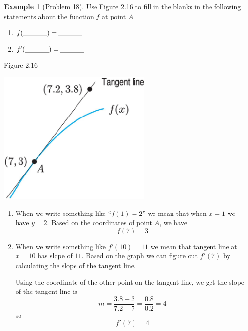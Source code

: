 \documentclass[oneside]{book}
\newcommand{\blank}{\underline{\hspace{0.5in}}}
\theoremstyle{definition}
\newtheorem{example}{Example}
\newcommand{\handoutpagebreak}{}
\theoremstyle{solution}
\newtheorem*{solution}{Solution}
\newcommand{\handoutpagebreak}{\newpage}
\newenvironment{solution}{\vspace{2in}\comment}{\endcomment}
\begin{document}
\begin{example}[Problem 18]
Use Figure 2.16 to fill in the blanks in the following statements
about the function $f$ at point $A$. 
\begin{enumerate}
\item  $f(\blank) = \blank$
\item $f'(\blank) = \blank$
\end{enumerate}
\begin{center}
{\large Figure 2.16}

  \includegraphics[width=3in]{Images/s2-1prob18.pdf}
\end{center}
\end{example}

\begin{solution}
\begin{enumerate}
\item When we write something like ``$f(1)=2$'' we mean that when
  $x=1$ we have $y=2$.  Based on the coordinates of point $A$, we have
  $$
\boxed{f(7) = 3}
$$

\item When we write something like $f'(10) = 11$ we mean that tangent
  line at $x=10$ has slope of $11$.  Based on the graph we can figure
  out $f'(7)$ by calculating the slope of the tangent line.  

  Using the coordinate of the other point on the tangent line, we get
  the slope of the tangent line is
 $$
 m = \frac{3.8 - 3}{7.2-7} = \frac{0.8}{0.2} = 4
$$
so 
$$
\boxed{f'(7) = 4}
$$
\end{enumerate}
\end{solution}

\handoutpagebreak
\end{document}
